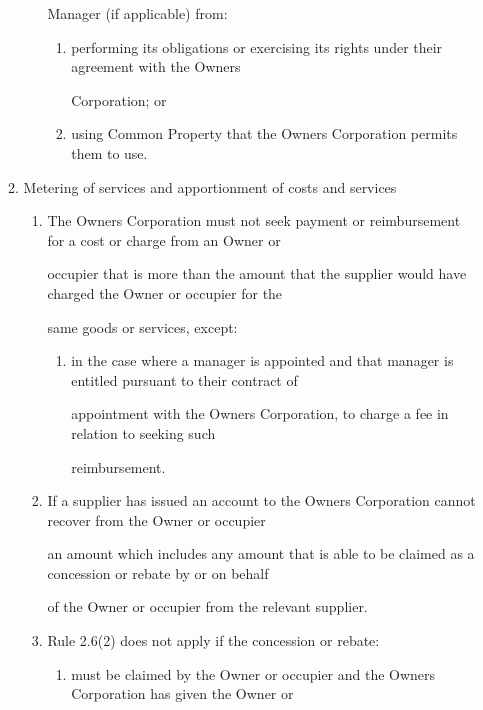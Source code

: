 \documentclass{article}
\begin{document}
\begin{enumerate}[label=\arabic*.]
\begin{enumerate}[label=\arabic{enumi}.\arabic*.]
\begin{enumerate}[label=(\arabic*)]
Manager (if applicable) from: 

\begin{enumerate}[label=(\alph*)]
\item  performing its obligations or exercising its rights under their agreement with the Owners 

Corporation; or 

\item  using Common Property that the Owners Corporation permits them to use. 

\end{enumerate}
\end{enumerate}
\item  Metering of services and apportionment of costs and services 

\begin{enumerate}[label=(\arabic*)]
\item  The Owners Corporation must not seek payment or reimbursement for a cost or charge from an Owner or 

occupier that is more than the amount that the supplier would have charged the Owner or occupier for the 

same goods or services, except: 

\begin{enumerate}[label=(\alph*)]
\item  in the case where a manager is appointed and that manager is entitled pursuant to their contract of 

appointment with the Owners Corporation, to charge a fee in relation to seeking such 

reimbursement. 

\end{enumerate}
\item  If a supplier has issued an account to the Owners Corporation cannot recover from the Owner or occupier 

an amount which includes any amount that is able to be claimed as a concession or rebate by or on behalf 

of the Owner or occupier from the relevant supplier. 

\item  Rule 2.6(2) does not apply if the concession or rebate: 

\begin{enumerate}[label=(\alph*)]
\item  must be claimed by the Owner or occupier and the Owners Corporation has given the Owner or 


\end{enumerate}
\end{enumerate}
\end{enumerate}
\end{enumerate}
\end{document}
